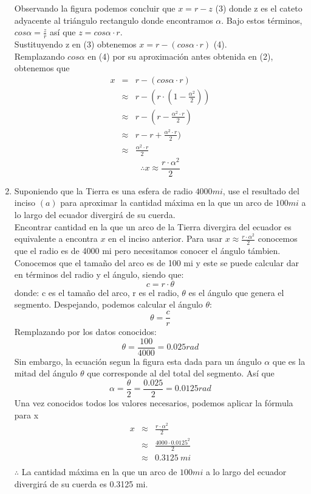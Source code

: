 \documentclass[12pt]{article}
\begin{document}
\begin{enumerate}[label=(\alph*)]
Observando la figura podemos concluir que $x = r - z$ (3) donde z es el cateto adyacente al triángulo rectangulo donde encontramos $\alpha$.
Bajo estos términos, $cos\alpha = \frac{z}{r} $ así que $z = cos \alpha \cdot r$.\\
Sustituyendo z  en (3) obtenemos $x = r -(cos \alpha \cdot r) $ (4).\\
Remplazando $cos\alpha$  en (4) por su aproximación antes obtenida en (2), obtenemos que 
\begin{eqnarray}
x
& = &  r -(cos \alpha \cdot r) \nonumber
\\
& \approx & r -(r \cdot (1 - \frac{\alpha^2}{2})) \nonumber
\\
& \approx  & r -(r - \frac{\alpha^2 \cdot r}{2}) \nonumber
\\
& \approx & r -r + \frac{\alpha^2 \cdot r}{2}) \nonumber
\\
& \approx & \frac{\alpha^2 \cdot r}{2} \nonumber
\end{eqnarray}
\[
\therefore x \approx \frac{r \cdot \alpha^2 }{2}
\]
\item Suponiendo que la Tierra es una esfera de radio $4000 mi$, use el resultado del inciso $(a)$ para aproximar la cantidad máxima en la que un arco de $100 mi$ a lo largo del ecuador divergirá de su cuerda.\\
Encontrar cantidad en la que un arco de la Tierra divergira del ecuador es equivalente a encontra $x$ en el inciso anterior.
Para usar $x \approx \frac{r \cdot \alpha^2 }{2}$ conocemos que el radio es de 4000 mi pero necesitamos conocer el ángulo támbien. \\
Conocemos que el tamaño del arco es de 100 mi y este se puede calcular dar en términos del radio y el ángulo, siendo que:
\[
c = r \cdot \theta
\]
donde:
c es el tamaño del arco,
r es el radio,
$\theta$ es el ángulo que genera el segmento.
Despejando, podemos calcular el ángulo $\theta$:
\[
\theta = \frac{c}{r}
\]
Remplazando por los datos conocidos:
\[
\theta = \frac{100}{4000} = 0.025 rad
\]
Sin embargo, la ecuación segun la figura esta dada para un ángulo $\alpha$ que es la mitad del ángulo $\theta$ que corresponde al del total del segmento.	Así que
\[
\alpha = \frac{\theta}{2} = \frac{0.025}{2}= 0.0125 rad
\]
Una vez conocidos todos los valores necesarios, podemos aplicar la fórmula para x
\begin{eqnarray}
x
& \approx &  \frac{r \cdot \alpha^2 }{2} \nonumber
\\
& \approx & \frac{4000 \cdot 0.0125^2 }{2} \nonumber
\\
& \approx  & 0.3125 ~ mi\nonumber
\\
\end{eqnarray}
$\therefore$  La cantidad máxima en la que un arco de $100 mi$ a lo largo del ecuador divergirá de su cuerda es 0.3125 mi.

\end{enumerate}
\end{document}
